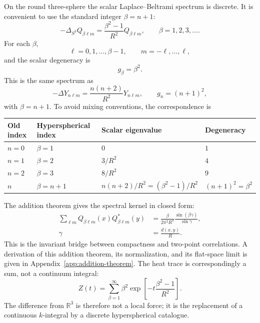 \documentclass[aps,prd,onecolumn,superscriptaddress,longbibliography,nofootinbib,notitlepage]{revtex4-2}
\renewcommand{\arraystretch}{1.17}
\begin{document}
On the round three-sphere the scalar Laplace--Beltrami spectrum is discrete. It is
convenient to use the standard integer $\beta=n+1$:
\begin{equation}
  -\Delta_{S^3}Q_{\beta\ell m}
  =\frac{\beta^2-1}{R^2}Q_{\beta\ell m},
  \qquad
  \beta=1,2,3,\ldots .
\end{equation}
For each $\beta$,
\begin{equation}
  \ell=0,1,\ldots,\beta-1,
  \qquad
  m=-\ell,\ldots,\ell,
\end{equation}
and the scalar degeneracy is
\begin{equation}
  g_\beta=\beta^2.
\end{equation}
This is the same spectrum as
\begin{equation}
  -\Delta Y_{n\ell m}=\frac{n(n+2)}{R^2}Y_{n\ell m},
  \qquad g_n=(n+1)^2,
\end{equation}
with $\beta=n+1$. To avoid mixing conventions, the correspondence is
\begin{center}
\small
\renewcommand{\arraystretch}{1.12}
\begin{tabular}{llll}
\toprule
Old index & Hyperspherical index & Scalar eigenvalue & Degeneracy \\
\midrule
$n=0$ & $\beta=1$ & $0$ & $1$ \\
$n=1$ & $\beta=2$ & $3/R^2$ & $4$ \\
$n=2$ & $\beta=3$ & $8/R^2$ & $9$ \\
$n$ & $\beta=n+1$ & $n(n+2)/R^2=(\beta^2-1)/R^2$ & $(n+1)^2=\beta^2$ \\
\bottomrule
\end{tabular}
\end{center}

The addition theorem gives the spectral kernel in closed form:
\begin{align}
  \sum_{\ell m}Q_{\beta\ell m}(x)Q^*_{\beta\ell m}(y)
  &=\frac{\beta}{2\pi^2R^3}\frac{\sin(\beta\gamma)}{\sin\gamma}, \\
  \gamma&=\frac{d(x,y)}{R}.
\end{align}
This is the invariant bridge between compactness and two-point correlations.
A derivation of this addition theorem, its normalization, and its flat-space
limit is given in Appendix~\ref{app:addition-theorem}.
The heat trace is correspondingly a sum, not a continuum integral:
\begin{equation}
  Z(t)=\sum_{\beta=1}^{\infty}\beta^2
  \exp\!\left[-t\frac{\beta^2-1}{R^2}\right].
\end{equation}
The difference from $\mathbb R^3$ is therefore not a local force; it is the
replacement of a continuous $k$-integral by a discrete hyperspherical catalogue.
\end{document}
